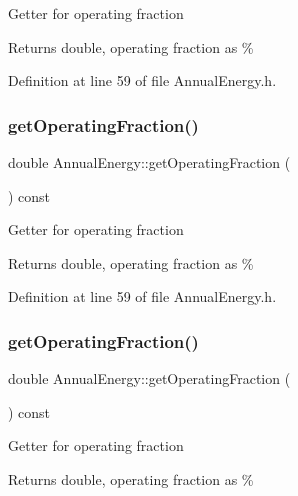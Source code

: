 Getter for operating fraction \begin{DoxyReturn}{Returns}
double, operating fraction as \% 
\end{DoxyReturn}


Definition at line 59 of file Annual\+Energy.\+h.

\mbox{\label{class_annual_energy_a51c2bd68a5268ec9bafe3c70b3a7a6ad}} 
\subsubsection{\texorpdfstring{get\+Operating\+Fraction()}{getOperatingFraction()}\hspace{0.1cm}{\footnotesize\ttfamily [2/3]}}
{\footnotesize\ttfamily double Annual\+Energy\+::get\+Operating\+Fraction (\begin{DoxyParamCaption}{ }\end{DoxyParamCaption}) const\hspace{0.3cm}{\ttfamily [inline]}}

Getter for operating fraction \begin{DoxyReturn}{Returns}
double, operating fraction as \% 
\end{DoxyReturn}


Definition at line 59 of file Annual\+Energy.\+h.

\mbox{\label{class_annual_energy_a51c2bd68a5268ec9bafe3c70b3a7a6ad}} 
\subsubsection{\texorpdfstring{get\+Operating\+Fraction()}{getOperatingFraction()}\hspace{0.1cm}{\footnotesize\ttfamily [3/3]}}
{\footnotesize\ttfamily double Annual\+Energy\+::get\+Operating\+Fraction (\begin{DoxyParamCaption}{ }\end{DoxyParamCaption}) const\hspace{0.3cm}{\ttfamily [inline]}}

Getter for operating fraction \begin{DoxyReturn}{Returns}
double, operating fraction as \% 
\end{DoxyReturn}


